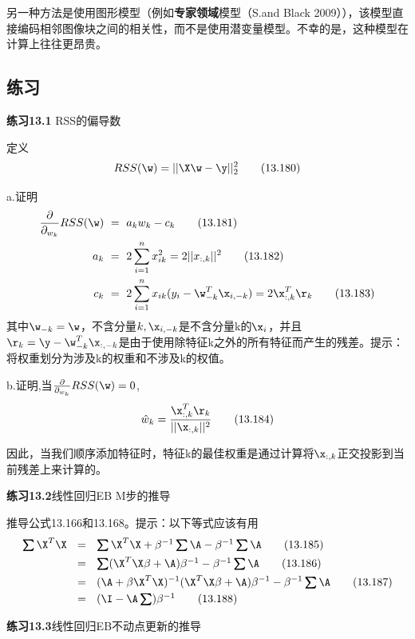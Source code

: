 \documentclass[a4paper]{article}
\begin{document}
另一种方法是使用图形模型（例如\textbf{专家领域}模型（S.and Black 2009）），该模型直接编码相邻图像块之间的相关性，而不是使用潜变量模型。不幸的是，这种模型在计算上往往更昂贵。

\subsection*{练习}

\textbf{练习13.1} RSS的偏导数

定义
\begin{equation}
	RSS(\w)=||\X\w-\y||_2^2\tag{13.180}
\end{equation}

a.证明
\begin{align}
	\frac{\partial}{\partial_{w_k}}RSS(\w)\ &=\ a_k w_k-c_k\tag{13.181}\\
	a_k\ &=\ 2\sum_{i=1}^{n}x_{ik}^2=2||x_{:,k}||^2\tag{13.182}\\
	c_k\ &=\ 2\sum_{i=1}^{n}x_{ik}(y_i-\w_{-k}^T\x_{i,-k})=2\x_{:,k}^T \r_k\tag{13.183}
\end{align}
其中$\w_{-k}=\w$，不含分量$k,\x_{i,-k}$是不含分量k的$\x_i$，并且$\r_k=\y-\w_{-k}^T\x_{:,-k}$是由于使用除特征k之外的所有特征而产生的残差。提示：将权重划分为涉及k的权重和不涉及k的权值。

b.证明,当$\frac{\partial}{\partial_{w_k}}RSS(\w)=0$,
\begin{equation}
	\hat{w}_k=\frac{\x_{:,k}^T\r_k}{||\x_{:,k}||^2}\tag{13.184}
\end{equation}

因此，当我们顺序添加特征时，特征k的最佳权重是通过计算将$\x_{:,k}$正交投影到当前残差上来计算的。

\textbf{练习13.2}线性回归EB M步的推导

推导公式13.166和13.168。提示：以下等式应该有用
\begin{align}
	\boldsymbol{\textstyle\sum}\X^T\X\ \ &=\ \ \boldsymbol{\textstyle\sum}\X^T\X+\beta^{-1}\boldsymbol{\textstyle\sum}\A-\beta^{-1}\boldsymbol{\textstyle\sum}\A\tag{13.185}\\
	&=\ \ \boldsymbol{\textstyle\sum}(\X^T\X\beta+\A)\beta^{-1}-\beta^{-1}\boldsymbol{\textstyle\sum}\A\tag{13.186}\\
	&=\ \ (\A+\beta\X^T\X)^{-1}(\X^T\X\beta+\A)\beta^{-1}-\beta^{-1}\boldsymbol{\textstyle\sum}\A\tag{13.187}\\
	&=\ \ (\I-\A\boldsymbol{\textstyle\sum})\beta^{-1}\tag{13.188}
\end{align}

\textbf{练习13.3}线性回归EB不动点更新的推导
\end{document}
